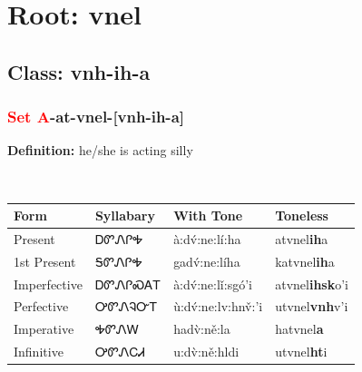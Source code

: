 \needspace{4in}
\section*{Root: vnel}
\nopagebreak
{}
\needspace{3in}
\subsection*{Class: vnh-ih-a}
\nopagebreak
\needspace{2in}
\subsubsection*{\textcolor{Red}{Set A}{-}at{-}\textbf{vnel}{-}[vnh-ih-a]}
\nopagebreak
\textbf{Definition: } he/she is acting silly
\\[0.5em]
\begin{tabularx}{\textwidth}{l X X X}%
\toprule%
\textbf{Form}&\textbf{Syllabary}&\textbf{With Tone}&\textbf{Toneless}\\%
\midrule%
Present&ᎠᏛᏁᎵᎭ&à:dv́:ne:lí:ha&atvnel\textbf{ih}a\\%
1st Present&ᎦᏛᏁᎵᎭ&gadv́:ne:líha&katvnel\textbf{ih}a\\%
Imperfective&ᎠᏛᏁᎵᏍᎪᎢ&à:dv́:ne:lǐ:sgó’i&atvnel\textbf{ihsk}o'i\\%
Perfective&ᎤᏛᏁᎸᏅᎢ&ù:dv́:ne:lv:hnv̌:’i&utvnel\textbf{vnh}v'i\\%
Imperative&ᎭᏛᏁᎳ&hadv̀:ně:la&hatvnel\textbf{a}\\%
Infinitive&ᎤᏛᏁᏟᏗ&u:dv̀:ně:hldi&utvnel\textbf{ht}i\\%
\bottomrule%
\end{tabularx}
\\[1em]